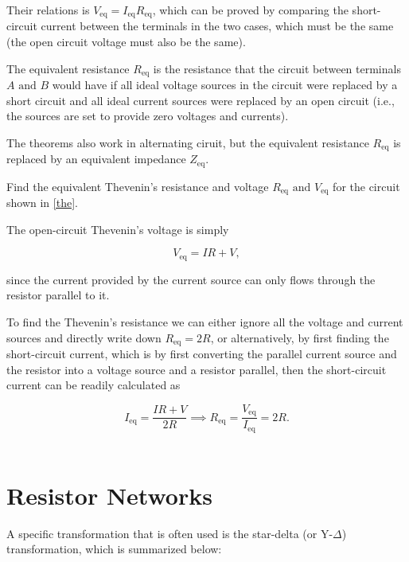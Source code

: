 \documentclass[english,a4paper,12pt]{report}
\begin{document}
Their relations is \(V_{\text{eq} } = I_{\text{eq} }R_{\text{eq} }\), which can be proved by comparing the short-circuit current between the terminals in the two cases, which must be the same (the open circuit voltage must also be the same). 

The equivalent resistance \(R_{\text{eq} } \)  is the resistance that the circuit between terminals \(A \text { and } B\)  would have if all ideal voltage sources in the circuit were replaced by a short circuit and all ideal current sources were replaced by an open circuit (i.e., the sources are set to provide zero voltages and currents).

The theorems also work in alternating ciruit, but the equivalent resistance \(R_{\text{eq} } \) is replaced by an equivalent impedance \(Z_{\text{eq} } \).

{Find the equivalent Thevenin's resistance and voltage \(R_{\text{eq} } \text { and } V_{\text{eq} }  \) for the circuit shown in \cref{the}.}
{The open-circuit Thevenin's voltage is simply 

\begin{equation}
    V_{\text{eq} } = IR + V, 
\end{equation}

since the current provided by the current source can only flows through the resistor parallel to it.

To find the Thevenin's resistance we can either ignore all the voltage and current sources and directly write down \(R_{\text{eq} } = 2R\), or alternatively, by first finding the short-circuit current, which is by first converting the parallel current source and the resistor into a voltage source and a resistor parallel, then the short-circuit current can be readily calculated as 

\begin{equation}
    I_{\text{eq} } = \frac{IR+V}{2R} \implies R_{\text{eq} } = \frac{V_{\text{eq} } }{I_{\text{eq} } } = 2R.    
\end{equation}
~
} 


\section{Resistor Networks}

A specific transformation that is often used is the star-delta (or Y-\(\Delta \)) transformation, which is summarized below:
\end{document}
